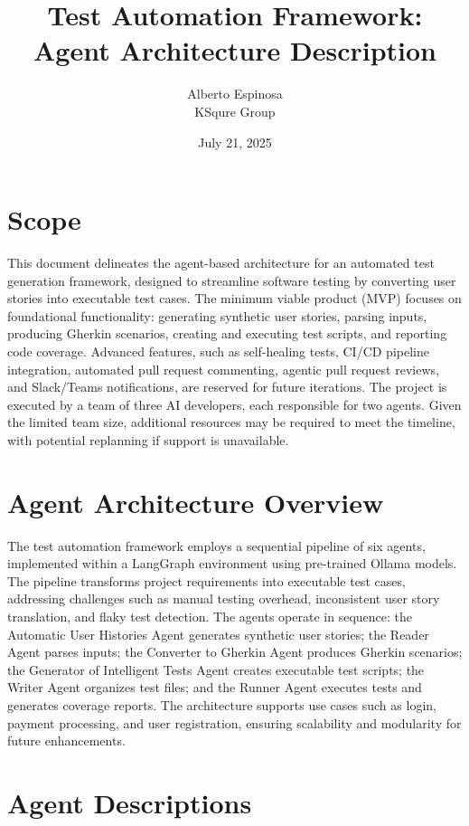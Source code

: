 \documentclass{article}
\title{Test Automation Framework: Agent Architecture Description}
\author{Alberto Espinosa\\
KSqure Group}
\date{July 21, 2025}
\begin{document}
\maketitle

\section{Scope}
This document delineates the agent-based architecture for an automated test generation framework, designed to streamline software testing by converting user stories into executable test cases. The minimum viable product (MVP) focuses on foundational functionality: generating synthetic user stories, parsing inputs, producing Gherkin scenarios, creating and executing test scripts, and reporting code coverage. Advanced features, such as self-healing tests, CI/CD pipeline integration, automated pull request commenting, agentic pull request reviews, and Slack/Teams notifications, are reserved for future iterations. The project is executed by a team of three AI developers, each responsible for two agents. Given the limited team size, additional resources may be required to meet the timeline, with potential replanning if support is unavailable.

\section{Agent Architecture Overview}
The test automation framework employs a sequential pipeline of six agents, implemented within a LangGraph environment using pre-trained Ollama models. The pipeline transforms project requirements into executable test cases, addressing challenges such as manual testing overhead, inconsistent user story translation, and flaky test detection. The agents operate in sequence: the Automatic User Histories Agent generates synthetic user stories; the Reader Agent parses inputs; the Converter to Gherkin Agent produces Gherkin scenarios; the Generator of Intelligent Tests Agent creates executable test scripts; the Writer Agent organizes test files; and the Runner Agent executes tests and generates coverage reports. The architecture supports use cases such as login, payment processing, and user registration, ensuring scalability and modularity for future enhancements.

\section{Agent Descriptions}
\end{document}
